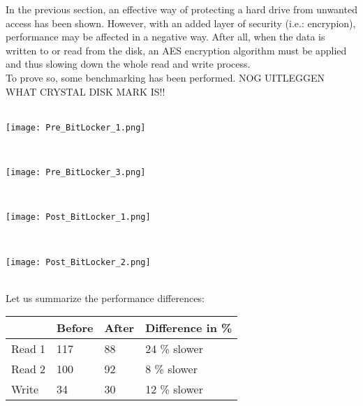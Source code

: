 In the previous section, an effective way of protecting a hard drive from unwanted access has been shown. However, with an added layer of security (i.e.: encrypion), performance may be affected in a negative way. After all, when the data is written to or read from the disk, an AES encryption algorithm must be applied and thus slowing down the whole read and write process. \\
To prove so, some benchmarking has been performed. NOG UITLEGGEN WHAT CRYSTAL DISK MARK IS!!
$\;$ \\ \\
\noindent\begin{minipage}{\textwidth}
    \centering
    \texttt{[image: Pre\_BitLocker\_1.png]}
\end{minipage}
$\;$ \\ \\
\noindent\begin{minipage}{\textwidth}
    \centering
    \texttt{[image: Pre\_BitLocker\_3.png]}
\end{minipage}
$\;$ \\ \\
\noindent\begin{minipage}{\textwidth}
    \centering
    \texttt{[image: Post\_BitLocker\_1.png]}
\end{minipage}
$\;$ \\ \\
\noindent\begin{minipage}{\textwidth}
    \centering
    \texttt{[image: Post\_BitLocker\_2.png]}
\end{minipage}
$\;$ \\ \\
Let us summarize the performance differences:
\begin{table}[h]
\begin{tabular}{|l|l|l|l|}
\hline
       & Before & After & Difference in \% \\ \hline
Read 1 & 117    & 88    & 24 \% slower     \\ \hline
Read 2 & 100    & 92    &   8 \% slower               \\ \hline
Write  & 34     & 30    &   12 \% slower               \\ \hline
\end{tabular}
\end{table}
